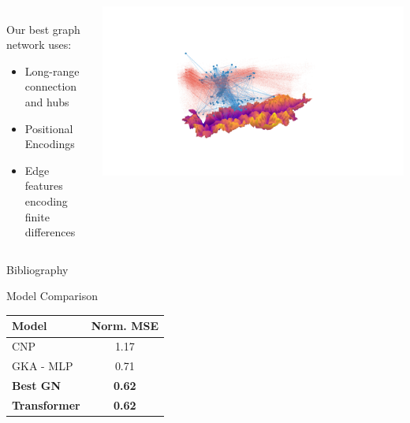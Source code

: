 \documentclass[aspectratio=169]{beamer}
\begin{document}
\begin{frame}
    \begin{columns}
        \begin{column}{0.4\textwidth}
             \\
            \vspace{10pt}
            Our best graph network uses:
            \begin{itemize}
                \item Long-range connection and hubs
                \item Positional Encodings
                \item Edge features encoding finite differences
            \end{itemize}

        \end{column}
        \begin{column}{0.6\textwidth}
            \centering
            \includegraphics[trim={13cm 6cm 15cm 8cm},clip,width=\textwidth]{imgs/south-gen.png}
        \end{column}
    \end{columns}
\end{frame}


\begin{colorframe}
    \begin{frame}[plain]{Bibliography}
        
        
    \end{frame}
\end{colorframe}

\begin{frame}{Model Comparison}
    \centering
    \begin{tabular}{lc} \toprule
        \textbf{Model}                               & Norm. MSE     \\ \hline
        CNP \cite{garnelo2018conditional}            & 1.17          \\
        GKA - MLP \cite{pannatier2022windnowcasting} & 0.71          \\
        \textbf{Best GN}                             & \textbf{0.62} \\
        \textbf{Transformer}                         & \textbf{0.62} \\
        \bottomrule
    \end{tabular}
\end{frame}
\end{document}
